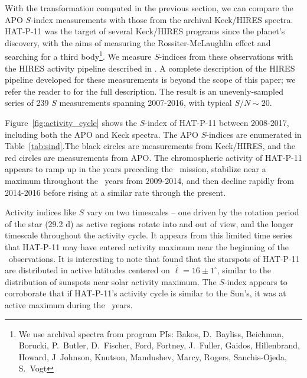 With the transformation computed in the previous section, we can compare the APO $S$-index measurements with those from the archival Keck/HIRES spectra. HAT-P-11 was the target of several Keck/HIRES programs since the planet's discovery, with the aims of measuring the Rossiter-McLaughlin effect and searching for a third body\footnote{We use archival spectra from program PIs: Bakos, D.~Bayliss, Beichman, Borucki, P.~Butler, D.~Fischer, Ford, Fortney, J.~Fuller, Gaidos, Hillenbrand, Howard, J~Johnson, Knutson, Mandushev, Marcy, Rogers, Sanchis-Ojeda, S.~Vogt}. We measure $S$-indices from these observations with the HIRES activity pipeline described in \citet{Isaacson2010}. A complete description of the HIRES pipeline developed for these measurements is beyond the scope of this paper; we refer the reader to \citet{Isaacson2010} for the full description. The result is an unevenly-sampled series of 239 $S$ measurements spanning 2007-2016, with typical $S/N \sim 20$. 

Figure~\ref{fig:activity_cycle} shows the $S$-index of HAT-P-11 between 2008-2017, including both the APO and Keck spectra. The APO $S$-indices are enumerated in Table~\ref{tab:sind}.The black circles are measurements from Keck/HIRES, and the red circles are measurements from APO. The chromospheric activity of HAT-P-11 appears to ramp up in the years preceding the \kepler\ mission, stabilize near a maximum throughout the \kepler\ years from 2009-2014, and then decline rapidly from 2014-2016 before rising at a similar rate through the present. 

Activity indices like $S$ vary on two timescales -- one driven by the rotation period of the star (29.2 d) as active regions rotate into and out of view, and the longer timescale throughout the activity cycle. It appears from this limited time series that HAT-P-11 may have entered activity maximum near the beginning of the \kepler\ observations. It is interesting to note that \citet{Morris2017} found that the starspots of HAT-P-11 are distributed in active latitudes centered on $\bar{\ell} = 16 \pm 1^\circ$, similar to the distribution of sunspots near solar activity maximum. The $S$-index appears to corroborate that if HAT-P-11's activity cycle is similar to the Sun's, it was at active maximum during the \kepler\ years.

